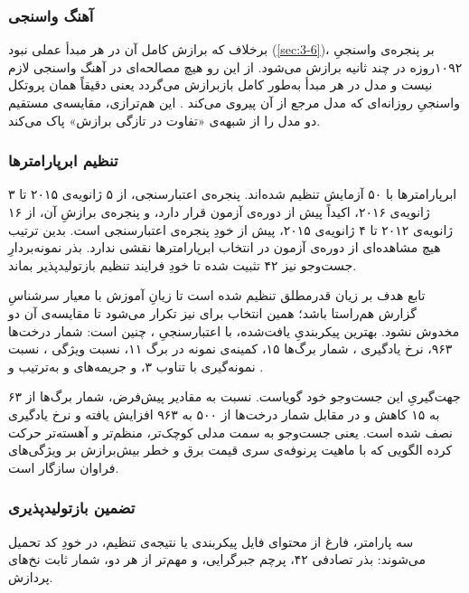 \subsubsection*{آهنگ واسنجی}

برخلاف  که برازش کامل آن در هر مبدأ عملی نبود (\cref{sec:3-6})، 
بر پنجره‌ی واسنجیِ ۱۰۹۲روزه در چند ثانیه برازش می‌شود. از این رو هیچ مصالحه‌ای در آهنگ
واسنجی لازم نیست و مدل در هر مبدأ به‌طور کامل بازبرازش می‌گردد  یعنی دقیقاً
همان پروتکل واسنجیِ روزانه‌ای که مدل مرجع  از آن پیروی می‌کند
\cite{lago_forecasting_2021}. این هم‌ترازی، مقایسه‌ی مستقیم دو مدل را از شبهه‌ی «تفاوت
در تازگی برازش» پاک می‌کند.

\subsubsection*{تنظیم ابرپارامترها}

ابرپارامترها با ۵۰ آزمایش  تنظیم شده‌اند. پنجره‌ی اعتبارسنجی، از ۵ ژانویه‌ی
۲۰۱۵ تا ۳ ژانویه‌ی ۲۰۱۶، اکیداً پیش از دوره‌ی آزمون قرار دارد، و پنجره‌ی برازشِ آن، از ۱۶
ژانویه‌ی ۲۰۱۲ تا ۴ ژانویه‌ی ۲۰۱۵، پیش از خودِ پنجره‌ی اعتبارسنجی است. بدین ترتیب هیچ
مشاهده‌ای از دوره‌ی آزمون در انتخاب ابرپارامترها نقشی ندارد. بذر نمونه‌بردارِ جست‌وجو
نیز ۴۲ تثبیت شده تا خودِ فرایند تنظیم بازتولیدپذیر بماند.

تابع هدف بر زیان قدرمطلق تنظیم شده است تا زیانِ آموزش با معیار سرشناسِ گزارش
هم‌راستا باشد؛ همین انتخاب برای  نیز تکرار می‌شود تا مقایسه‌ی آن دو مخدوش
نشود. بهترین پیکربندیِ یافت‌شده، با  اعتبارسنجیِ ، چنین است:
شمار درخت‌ها ۹۶۳، نرخ یادگیری ، شمار برگ‌ها ۱۵، کمینه‌ی نمونه در
برگ ۱۱، نسبت ویژگی ، نسبت نمونه‌گیری  با تناوب ۳، و
جریمه‌های  و  به‌ترتیب  و .

جهت‌گیریِ این جست‌وجو خود گویاست. نسبت به مقادیر پیش‌فرض، شمار برگ‌ها از ۶۳ به ۱۵
کاهش و در مقابل شمار درخت‌ها از ۵۰۰ به ۹۶۳ افزایش یافته و نرخ یادگیری نصف شده
است. یعنی جست‌وجو به سمت مدلی کوچک‌تر، منظم‌تر و آهسته‌تر حرکت کرده  الگویی که
با ماهیت پرنوفه‌ی سری قیمت برق و خطر بیش‌برازش بر ویژگی‌های فراوان سازگار است.

\subsubsection*{تضمین بازتولیدپذیری}

سه پارامتر، فارغ از محتوای فایل پیکربندی یا نتیجه‌ی تنظیم، در خودِ کد تحمیل می‌شوند:
بذر تصادفی ۴۲، پرچم جبرگرایی، و مهم‌تر از هر دو، شمار ثابت نخ‌های پردازش.

